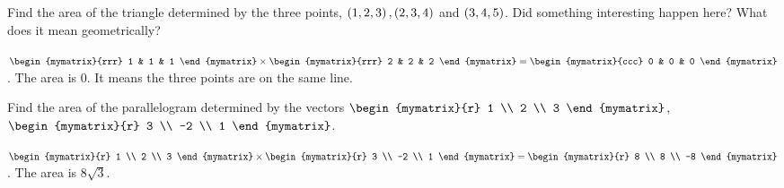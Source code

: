 \begin{enumialphparenastyle}
\begin{ex}
  Find the area of the triangle determined by the three points,
  $\left( 1,2,3\right) ,\left(2,3,4\right) $ and $\left(3,4,5\right)$. Did something
  interesting happen here? What does it mean geometrically?
  \begin{sol}
    $\begin{mymatrix}{rrr}
      1 & 1 & 1
    \end{mymatrix} \times \begin{mymatrix}{rrr}
      2 & 2 & 2
    \end{mymatrix} =\begin{mymatrix}{ccc}
      0 & 0 & 0
    \end{mymatrix}$.  The area is 0. It means the three points are on
    the same line.
  \end{sol}
\end{ex}

\begin{ex}
  Find the area of the parallelogram determined by the vectors
  $\begin{mymatrix}{r}
    1 \\
    2 \\
    3
  \end{mymatrix} $, $\begin{mymatrix}{r}
    3 \\
    -2 \\
    1
  \end{mymatrix}$.
  \begin{sol}
    $\begin{mymatrix}{r}
      1 \\
      2 \\
      3
    \end{mymatrix} \times
    \begin{mymatrix}{r}
      3 \\
      -2 \\
      1
    \end{mymatrix} =\begin{mymatrix}{r}
      8 \\
      8 \\
      -8
    \end{mymatrix}$. The area is $8\sqrt{3}$.
  \end{sol}
\end{ex}



\end{enumialphparenastyle}
